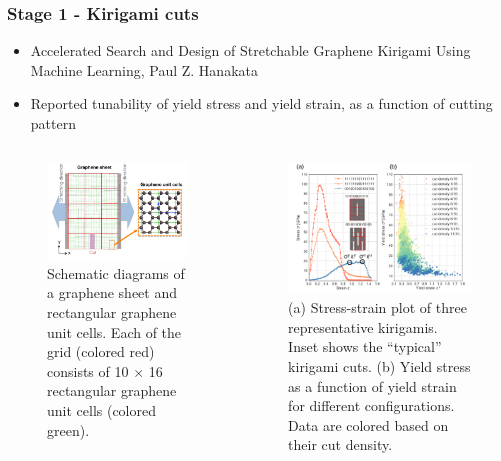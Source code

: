 \documentclass[
	10pt, %
]{beamer}
\begin{document}
\begin{frame}
	\frametitle{Stage 1 - Kirigami cuts}

	\begin{itemize}
		\item Accelerated Search and Design of Stretchable Graphene Kirigami Using Machine Learning, Paul Z. Hanakata
		\item Reported tunability of yield stress and yield strain, as a function of cutting pattern
	\end{itemize}


	\begin{columns}[c] %
		\begin{column}{0.5\textwidth} %
			\begin{figure}
				\includegraphics[width=0.7\linewidth]{Hanakata1.png}
				\caption{Schematic diagrams of a graphene sheet and rectangular graphene unit cells. Each of the grid (colored red) consists of 10 × 16 rectangular graphene unit cells (colored green).}
			\end{figure}
		\end{column}
		\begin{column}{0.5\textwidth} %
			\begin{figure}
				\includegraphics[width=0.7\linewidth]{Hanakata2.png}
				\caption{(a) Stress-strain plot of three representative kirigamis. Inset shows the “typical” kirigami cuts. (b) Yield stress as a function of yield strain for different configurations. Data are colored based on their cut density.}
			\end{figure}
		\end{column}
	\end{columns}

\end{frame}
\end{document}
